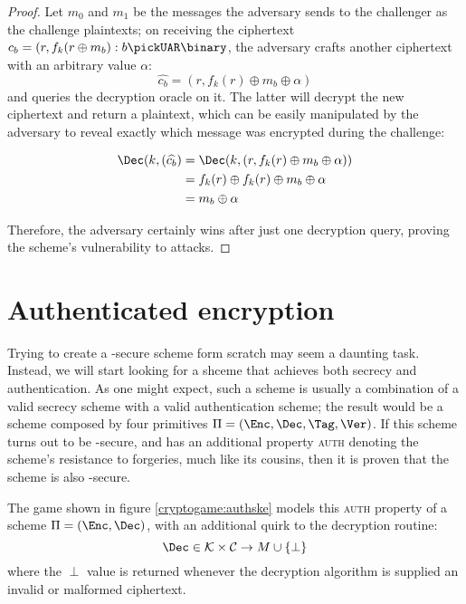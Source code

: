\begin{proof}

    Let $m_0$ and $m_1$ be the messages the adversary sends to the challenger as the challenge plaintexts; on receiving the ciphertext $c_b = (r, f_k(r \oplus m_b) : b \pickUAR \binary$, the adversary crafts another ciphertext with an arbitrary value $\alpha$:
    \[
        \widehat{c_b} = (r, f_k(r) \oplus m_b \oplus \alpha)
    \]
    and queries the decryption oracle on it. The latter will decrypt the new ciphertext and return a plaintext, which can be easily manipulated by the adversary to reveal exactly which message was encrypted during the challenge:

    \begin{align*}
        \Dec(k, (\widehat{c_b}) &= \Dec(k, (r, f_k(r) \oplus m_b \oplus \alpha))    \\
                                &= f_k(r) \oplus f_k(r) \oplus m_b \oplus \alpha      \\
                                &= m_b \oplus \alpha                              \\
    \end{align*}

    Therefore, the adversary certainly wins after just one decryption query, proving the scheme's vulnerability to \cca{} attacks.
   
\end{proof}

\section{Authenticated encryption}

Trying to create a \cca-secure scheme form scratch may seem a daunting task. Instead, we will start looking for a shceme that achieves both secrecy and authentication. As one might expect, such a scheme is usually a combination of a valid secrecy scheme with a valid authentication scheme; the result would be a scheme composed by four primitives $\Pi = (\Enc, \Dec, \Tag, \Ver)$. If this scheme turns out to be \cpa-secure, and has an additional property \textsc{auth} denoting the scheme's resistance to forgeries, much like its \mac{} cousins, then it is proven that the scheme is also \cca-secure.

The game shown in figure \ref{cryptogame:authske} models this \textsc{auth} property of a scheme $\Pi = (\Enc, \Dec)$, with an additional quirk to the decryption routine:
\[
    \Dec \in \K \times \C \to M \cup \{\perp\}
\]
where the $\perp$ value is returned whenever the decryption algorithm is supplied an invalid or malformed ciphertext.

